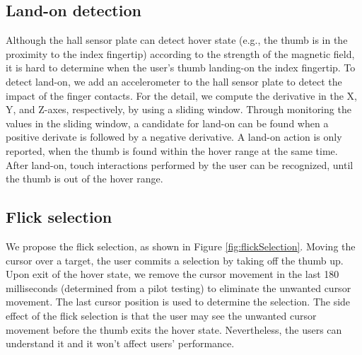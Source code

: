 


\subsection{Land-on detection}
Although the hall sensor plate can detect hover state (e.g., the thumb is in the proximity to the index fingertip) according to the strength of the magnetic field, it is hard to determine when the user's thumb landing-on the index fingertip.
To detect land-on, we add an accelerometer to the hall sensor plate to detect the impact of the finger contacts.
For the detail, we compute the derivative in the X, Y, and Z-axes, respectively, by using a sliding window. 
Through monitoring the values in the sliding window, a candidate for land-on can be found when a positive derivate is followed by a negative derivative.
A land-on action is only reported, when the thumb is found within the hover range at the same time.
After land-on, touch interactions performed by the user can be recognized, until the thumb is out of the hover range.

\subsection{Flick selection}
We propose the flick selection, as shown in Figure \ref{fig:flickSelection}.
Moving the cursor over a target, the user commits a selection by taking off the thumb up.
Upon exit of the hover state, we remove the cursor movement in the last 180 milliseconds (determined from a pilot testing) to eliminate the unwanted cursor movement. The last cursor position is used to determine the selection. 
The side effect of the flick selection is that the user may see the unwanted cursor movement before the thumb exits the hover state.
Nevertheless, the users can understand it and it won't affect users' performance.  

